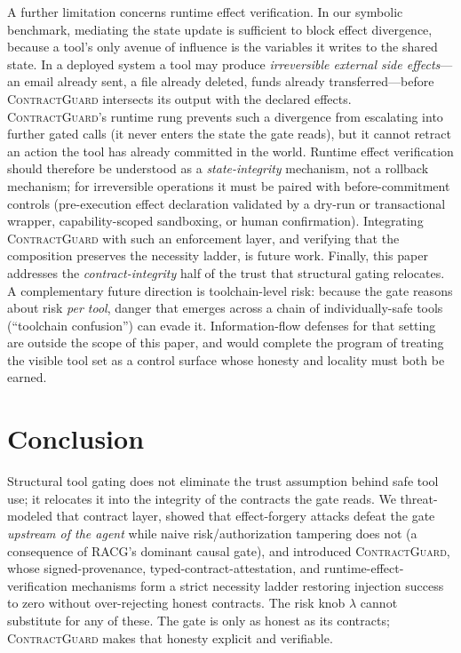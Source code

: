 \documentclass[conference,onecolumn]{IEEEtran}
\theoremstyle{definition}
\newcommand{\racg}{\textsc{RACG}}
\newcommand{\cg}{\textsc{ContractGuard}}
\begin{document}
A further limitation concerns runtime effect verification. In our symbolic
benchmark, mediating the state update is sufficient to block effect divergence,
because a tool's only avenue of influence is the variables it writes to the
shared state. In a deployed system a tool may produce \emph{irreversible external
side effects}---an email already sent, a file already deleted, funds already
transferred---before \cg{} intersects its output with the declared effects.
\cg{}'s runtime rung prevents such a divergence from escalating into further
gated calls (it never enters the state the gate reads), but it cannot retract an
action the tool has already committed in the world. Runtime effect verification
should therefore be understood as a \emph{state-integrity} mechanism, not a
rollback mechanism; for irreversible operations it must be paired with
before-commitment controls (pre-execution effect declaration validated by a
dry-run or transactional wrapper, capability-scoped sandboxing, or human
confirmation). Integrating \cg{} with such an enforcement layer, and verifying
that the composition preserves the necessity ladder, is future work. Finally, this paper addresses the \emph{contract-integrity} half of
the trust that structural gating relocates. A complementary future direction is
toolchain-level risk: because the gate reasons about risk \emph{per tool}, danger
that emerges across a chain of individually-safe tools (``toolchain confusion'')
can evade it. Information-flow defenses for that setting are outside the scope of
this paper, and would complete the program of treating the visible tool set as a
control surface whose honesty and locality must both be earned.

\section{Conclusion}
Structural tool gating does not eliminate the trust assumption behind safe tool
use; it relocates it into the integrity of the contracts the gate reads. We
threat-modeled that contract layer, showed that effect-forgery attacks defeat the
gate \emph{upstream of the agent} while naive risk/authorization tampering does
not (a consequence of \racg's dominant causal gate), and introduced \cg, whose
signed-provenance, typed-contract-attestation, and runtime-effect-verification
mechanisms form a strict necessity ladder restoring injection success to zero
without over-rejecting honest contracts. The risk knob $\lambda$ cannot
substitute for any of these. The gate is only as honest as its contracts;
\cg{} makes that honesty explicit and verifiable.



\end{document}
